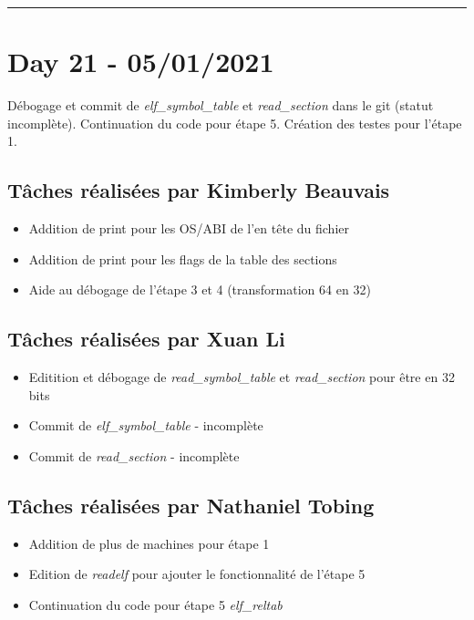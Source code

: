 \documentclass[11pt,letterpaper]{article}
\begin{document}
\noindent\rule{13cm}{0.4pt}

\section*{Day 21 - 05/01/2021}
Débogage et commit de \textit{elf\_symbol\_table} et \textit{read\_section} 
dans le git (statut incomplète). Continuation du code pour étape 5. Création 
des testes pour l'étape 1.

\subsection*{Tâches réalisées par Kimberly Beauvais}
\begin{itemize}
    \item Addition de print pour les OS/ABI de l'en tête du fichier
    \item Addition de print pour les flags de la table des sections
    \item Aide au débogage de l'étape 3 et 4 (transformation 64 en 32)
\end{itemize}

\subsection*{Tâches réalisées par Xuan Li}
\begin{itemize}
    \item Editition et débogage de \textit{read\_symbol\_table} et 
    \textit{read\_section} pour être en 32 bits
    \item Commit de \textit{elf\_symbol\_table} - incomplète
    \item Commit de \textit{read\_section} - incomplète
\end{itemize}

\subsection*{Tâches réalisées par Nathaniel Tobing}
\begin{itemize}
    \item Addition de plus de machines pour étape 1
    \item Edition de \textit{readelf} pour ajouter le fonctionnalité de l'étape 5
    \item Continuation du code pour étape 5 \textit{elf\_reltab}
\end{itemize}
\end{document}
